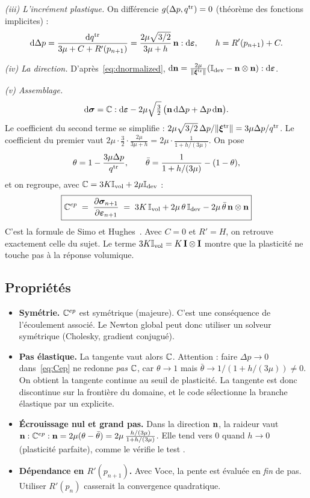 \emph{(iii) L'incrément plastique.} On différencie $g(\Delta p,q^{\mathrm{tr}})=0$ (théorème des fonctions implicites) :
\[
\mathrm{d}\Delta p = \frac{\mathrm{d} q^{\mathrm{tr}}}{3\mu+C+R'(p_{n+1})} = \frac{2\mu\sqrt{3/2}}{3\mu+h}\,\mathbf{n}:\mathrm{d}\boldsymbol{\varepsilon},\qquad h=R'(p_{n+1})+C.
\]

\emph{(iv) La direction.} D'après~\eqref{eq:dnormalized}, $\mathrm{d}\mathbf{n} = \frac{2\mu}{\|\boldsymbol{\xi}^{\mathrm{tr}}\|}(\mathbb{I}_{\mathrm{dev}}-\mathbf{n}\otimes\mathbf{n}):\mathrm{d}\boldsymbol{\varepsilon}$.

\emph{(v) Assemblage.}
\[
\mathrm{d}\boldsymbol{\sigma} = \mathbb{C}:\mathrm{d}\boldsymbol{\varepsilon} - 2\mu\sqrt{\tfrac32}\,\big(\mathbf{n}\,\mathrm{d}\Delta p + \Delta p\,\mathrm{d}\mathbf{n}\big).
\]
Le coefficient du second terme se simplifie : $2\mu\sqrt{3/2}\,\Delta p/\|\boldsymbol{\xi}^{\mathrm{tr}}\| = 3\mu\Delta p/q^{\mathrm{tr}}$. Le coefficient du premier vaut $2\mu\cdot\frac32\cdot\frac{2\mu}{3\mu+h} = 2\mu\cdot\frac{1}{1+h/(3\mu)}$. On pose
\begin{equation}
\theta = 1-\frac{3\mu\Delta p}{q^{\mathrm{tr}}},\qquad \bar\theta = \frac{1}{1+h/(3\mu)}-(1-\theta),
\end{equation}
et on regroupe, avec $\mathbb{C}=3K\mathbb{I}_{\mathrm{vol}}+2\mu\mathbb{I}_{\mathrm{dev}}$ :
\begin{equation}
\boxed{\begin{aligned}
\mathbb{C}^{ep} \;=\; \frac{\partial\boldsymbol{\sigma}_{n+1}}{\partial\boldsymbol{\varepsilon}_{n+1}} \;=\; 3K\,\mathbb{I}_{\mathrm{vol}} + 2\mu\,\theta\,\mathbb{I}_{\mathrm{dev}} - 2\mu\,\bar\theta\,\mathbf{n}\otimes\mathbf{n}
\end{aligned}}
\label{eq:Cep}
\end{equation}
C'est la formule de Simo et Hughes~\cite{simo1998}. Avec $C=0$ et $R'=H$, on retrouve exactement celle du sujet. Le terme $3K\mathbb{I}_{\mathrm{vol}}=K\,\mathbf{I}\otimes\mathbf{I}$ montre que la plasticité ne touche pas à la réponse volumique.

\subsection{Propriétés}

\begin{itemize}[nosep]
  \item \textbf{Symétrie.} $\mathbb{C}^{ep}$ est symétrique (majeure). C'est une conséquence de l'écoulement associé. Le Newton global peut donc utiliser un solveur symétrique (Cholesky, gradient conjugué).
  \item \textbf{Pas élastique.} La tangente vaut alors $\mathbb{C}$. Attention : faire $\Delta p\to0$ dans~\eqref{eq:Cep} ne redonne \emph{pas} $\mathbb{C}$, car $\theta\to1$ mais $\bar\theta\to1/(1+h/(3\mu))\neq0$. On obtient la tangente continue au seuil de plasticité. La tangente est donc discontinue sur la frontière du domaine, et le code sélectionne la branche élastique par un  explicite.
  \item \textbf{Écrouissage nul et grand pas.} Dans la direction $\mathbf{n}$, la raideur vaut $\mathbf{n}:\mathbb{C}^{ep}:\mathbf{n} = 2\mu(\theta-\bar\theta) = 2\mu\,\frac{h/(3\mu)}{1+h/(3\mu)}$. Elle tend vers 0 quand $h\to0$ (plasticité parfaite), comme le vérifie le test .
  \item \textbf{Dépendance en $R'(p_{n+1})$.} Avec Voce, la pente est évaluée en \emph{fin} de pas. Utiliser $R'(p_n)$ casserait la convergence quadratique.
\end{itemize}
